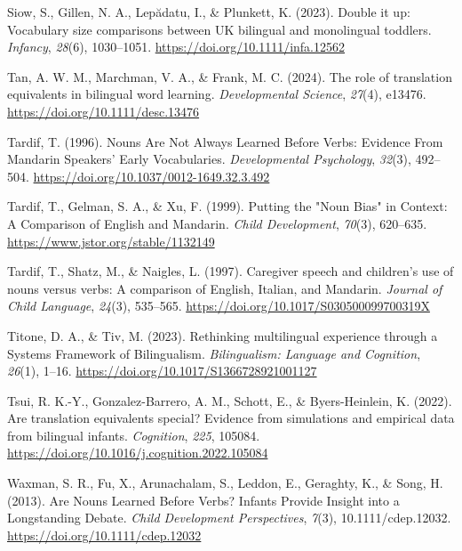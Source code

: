 \documentclass[10pt, letterpaper]{article}
\begin{document}
\begin{CSLReferences}{1}{0}
Siow, S., Gillen, N. A., Lepădatu, I., \& Plunkett, K. (2023). Double it
up: {Vocabulary} size comparisons between {UK} bilingual and monolingual
toddlers. \emph{Infancy}, \emph{28}(6), 1030--1051.
\url{https://doi.org/10.1111/infa.12562}

Tan, A. W. M., Marchman, V. A., \& Frank, M. C. (2024). The role of
translation equivalents in bilingual word learning. \emph{Developmental
Science}, \emph{27}(4), e13476. \url{https://doi.org/10.1111/desc.13476}

Tardif, T. (1996). Nouns {Are Not Always Learned Before Verbs}:
{Evidence From Mandarin Speakers}' {Early Vocabularies}.
\emph{Developmental Psychology}, \emph{32}(3), 492--504.
\url{https://doi.org/10.1037/0012-1649.32.3.492}

Tardif, T., Gelman, S. A., \& Xu, F. (1999). Putting the "{Noun Bias}"
in {Context}: {A Comparison} of {English} and {Mandarin}. \emph{Child
Development}, \emph{70}(3), 620--635.
\url{https://www.jstor.org/stable/1132149}

Tardif, T., Shatz, M., \& Naigles, L. (1997). Caregiver speech and
children's use of nouns versus verbs: {A} comparison of {English},
{Italian}, and {Mandarin}. \emph{Journal of Child Language},
\emph{24}(3), 535--565. \url{https://doi.org/10.1017/S030500099700319X}

Titone, D. A., \& Tiv, M. (2023). Rethinking multilingual experience
through a {Systems Framework} of {Bilingualism}. \emph{Bilingualism:
Language and Cognition}, \emph{26}(1), 1--16.
\url{https://doi.org/10.1017/S1366728921001127}

Tsui, R. K.-Y., Gonzalez-Barrero, A. M., Schott, E., \& Byers-Heinlein,
K. (2022). Are translation equivalents special? {Evidence} from
simulations and empirical data from bilingual infants. \emph{Cognition},
\emph{225}, 105084.
\url{https://doi.org/10.1016/j.cognition.2022.105084}

Waxman, S. R., Fu, X., Arunachalam, S., Leddon, E., Geraghty, K., \&
Song, H. (2013). Are {Nouns Learned Before Verbs}? {Infants Provide
Insight} into a {Longstanding Debate}. \emph{Child Development
Perspectives}, \emph{7}(3), 10.1111/cdep.12032.
\url{https://doi.org/10.1111/cdep.12032}


\end{CSLReferences}
\end{document}
